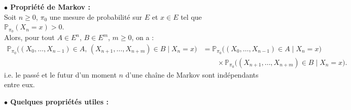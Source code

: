 \documentclass[11pt]{article}
\begin{document}
\textbf{$\bullet$ Propriété de Markov :} \\
Soit $n \ge 0$, $\pi_0$ une mesure de probabilité sur $E$ et $x \in E$ tel que $\mathbb{P}_{\pi_0}(X_n=x)>0$.\\
Alors, pour tout $A \in E^n$, $B \in E^m$, $m \ge 0$, on a :
\[
\begin{aligned}
\mathbb{P}_{\pi_0}\bigl((X_0,\ldots,X_{n-1}) \in A,\,(X_{n+1},\ldots,X_{n+m}) \in B \mid X_n=x\bigr)
&= \mathbb{P}_{\pi_0}\bigl((X_0,\ldots,X_{n-1}) \in A \mid X_n=x\bigr) \\
&\qquad \times \mathbb{P}_{\pi_0}\bigl((X_{n+1},\ldots,X_{n+m}) \in B \mid X_n=x\bigr).
\end{aligned}
\]
i.e. le passé et le futur d'un moment $n$ d'une chaîne de Markov sont indépendants entre eux.

\newpage

\textbf{$\bullet$ Quelques propriétés utiles :} \\
\end{document}
